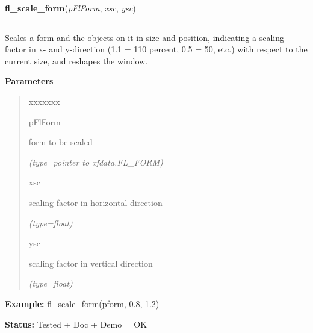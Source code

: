\hspace{.8\funcindent}\begin{boxedminipage}{\funcwidth}

    \raggedright \textbf{fl\_scale\_form}(\textit{pFlForm}, \textit{xsc}, \textit{ysc})

    \vspace{-1.5ex}

    \rule{\textwidth}{0.5\fboxrule}
\setlength{\parskip}{2ex}
    Scales a form and the objects on it in size and position, indicating a 
    scaling factor in x- and y-direction (1.1 = 110 percent, 0.5 = 50, 
    etc.) with respect to the current size, and reshapes the window.

\setlength{\parskip}{1ex}
      \textbf{Parameters}
      \vspace{-1ex}

      \begin{quote}
        \begin{Ventry}{xxxxxxx}

          \item[pFlForm]

          form to be scaled

            {\it (type=pointer to xfdata.FL\_FORM)}

          \item[xsc]

          scaling factor in horizontal direction

            {\it (type=float)}

          \item[ysc]

          scaling factor in vertical direction

            {\it (type=float)}

        \end{Ventry}

      \end{quote}

\textbf{Example:} fl\_scale\_form(pform, 0.8, 1.2)



\textbf{Status:} Tested + Doc + Demo = OK



    \end{boxedminipage}

    \label{xformslib:flbasic:fl_set_form_position}

